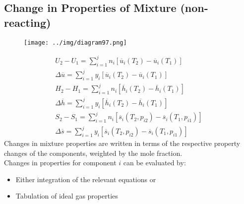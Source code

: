\documentclass[class=report, crop=false, 12pt,a4paper]{standalone}
\numberwithin{equation}{section}
\begin{document}
\subsection{Change in Properties of Mixture (non-reacting)}
\begin{figure}[H]
  \centering
  \texttt{[image: ../img/diagram97.png]}
  \caption{}
\end{figure}
\begin{gather}
  U_2 - U_1 = \sum_{i=1}^{j}n_i\left[\overline{u}_i(T_2) - \overline{u}_i(T_1)\right] \\[5pt]
  \Delta\overline{u} = \sum_{i=1}^{j}y_i\left[\overline{u}_i(T_2) - \overline{u}_i(T_1)\right] \\[15pt]
  H_2 - H_1 = \sum_{i=1}^{j}n_i\left[\overline{h}_i(T_2) - \overline{h}_i(T_1)\right] \\[5pt]
  \Delta\overline{h} = \sum_{i=1}^{j}y_i\left[\overline{h}_i(T_2) - \overline{h}_i(T_1)\right] \\[15pt]
  S_2 - S_1 = \sum_{i=1}^{j}n_i\left[\overline{s}_i(T_2,p_{i2}) - \overline{s}_i(T_1,p_{i1})\right] \\[5pt]
  \Delta\overline{s} = \sum_{i=1}^{j}y_i\left[\overline{s}_i(T_2,p_{i2}) - \overline{s}_i(T_1,p_{i1})\right]
\end{gather}
Changes in mixture properties are written in terms of the respective property changes of the components, weighted by the mole fraction. \\
Changes in properties for component $i$ can be evaluated by:
\begin{itemize}[noitemsep]
  \item Either integration of the relevant equations or
  \item Tabulation of ideal gas properties 
\end{itemize}
\end{document}
